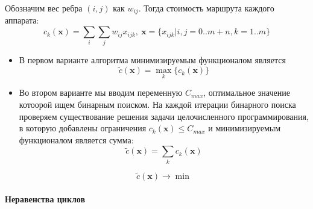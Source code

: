 \documentclass[a4paper,14pt,russian]{article}
\begin{document}
Обозначим вес ребра $(i, j)$ как $w_{i j}$. Тогда стоимость маршрута каждого аппарата:
\begin{equation}
c_k(\mathbf{x}) = \displaystyle\sum_i \displaystyle\sum_j w_{i j} x_{i j k}, ~\mathbf{x} = \{x_{i j k} | i, j = 0..m+n, k = 1..m\}
\end{equation}


\begin{itemize}
\item В первом варианте алгоритма минимизируемым функционалом является
\begin{equation}
\widetilde{c}(\mathbf{x}) = \displaystyle\max_k \{c_k(\mathbf{x})\}
\end{equation}

\item Во втором варианте мы вводим переменную $C_{max}$, оптимальное значение котоорой ищем бинарным поиском. На каждой итерации бинарного поиска проверяем существование решения задачи целочисленного программирования, в которую добавлены ограничения $c_k(\mathbf{x}) \le C_{max}$ и минимизируемым функционалом является сумма:
\begin{equation}
\widetilde{c}(\mathbf{x}) = \displaystyle\sum_k c_k(\mathbf{x})
\end{equation}

\begin{equation} \label{lin2}
\widetilde{c}(\mathbf{x}) \rightarrow \min
\end{equation}

\end{itemize}


\paragraph{Неравенства циклов} ~\\
\end{document}
